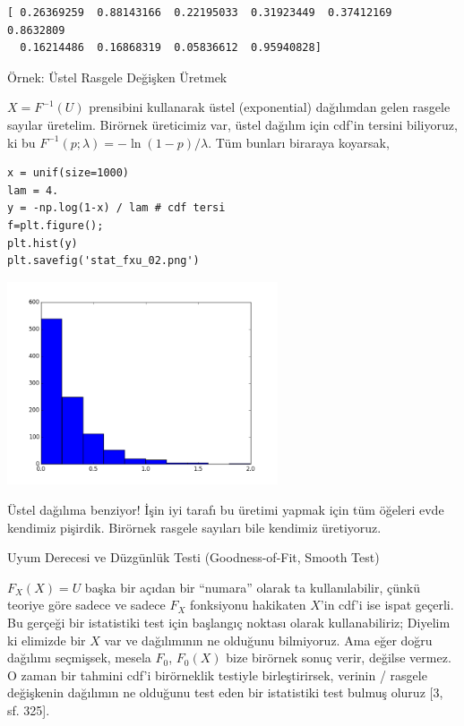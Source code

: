 \documentclass[12pt,fleqn]{article}\usepackage{../../common}
\begin{document}
\begin{verbatim}
[ 0.26369259  0.88143166  0.22195033  0.31923449  0.37412169  0.8632809
  0.16214486  0.16868319  0.05836612  0.95940828]
\end{verbatim}

Örnek: Üstel Rasgele Değişken Üretmek

$X = F^{-1}(U)$ prensibini kullanarak üstel (exponential) dağılımdan gelen
rasgele sayılar üretelim. Birörnek üreticimiz var, üstel dağılım için
cdf'in tersini biliyoruz, ki bu $F^{-1}(p;\lambda) = -\ln(1-p) /
\lambda$. Tüm bunları biraraya koyarsak,

\begin{verbatim}
x = unif(size=1000)
lam = 4.
y = -np.log(1-x) / lam # cdf tersi
f=plt.figure();
plt.hist(y)
plt.savefig('stat_fxu_02.png')
\end{verbatim}

\includegraphics[height=6cm]{stat_fxu_02.png}

Üstel dağılıma benziyor! İşin iyi tarafı bu üretimi yapmak için tüm
öğeleri evde kendimiz pişirdik. Birörnek rasgele sayıları bile kendimiz
üretiyoruz. 

Uyum Derecesi ve Düzgünlük Testi (Goodness-of-Fit, Smooth Test)

$F_X(X) = U$ başka bir açıdan bir ``numara'' olarak ta kullanılabilir,
çünkü teoriye göre sadece ve sadece $F_X$ fonksiyonu hakikaten $X$'in cdf'i
ise ispat geçerli. Bu gerçeği bir istatistiki test için başlangıç noktası
olarak kullanabiliriz; Diyelim ki elimizde bir $X$ var ve dağılımının ne
olduğunu bilmiyoruz. Ama eğer doğru dağılımı seçmişsek, mesela $F_0$,
$F_0(X)$ bize birörnek sonuç verir, değilse vermez. O zaman bir tahmini
cdf'i birörneklik testiyle birleştirirsek, verinin / rasgele değişkenin
dağılımın ne olduğunu test eden bir istatistiki test bulmuş oluruz [3,
sf. 325].
\end{document}
